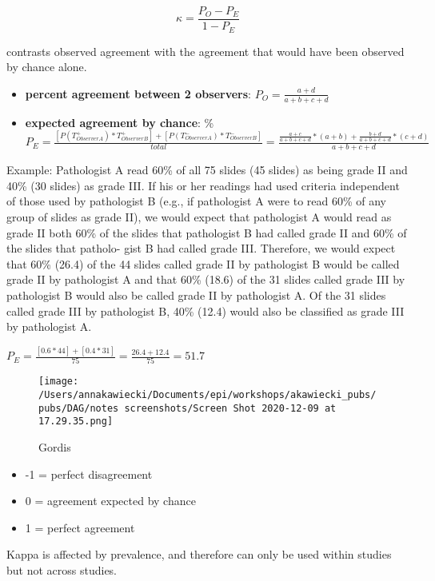 \documentclass[
]{article}
\providecommand{\tightlist}{%
  \setlength{\itemsep}{0pt}\setlength{\parskip}{0pt}}
\begin{document}
\[\kappa= \frac{P_O-P_E}{1-P_E}\]

contrasts observed agreement with the agreement that would have been
observed by chance alone.

\begin{itemize}
\item
  \textbf{percent agreement between 2 observers}:
  \(P_O = \frac{a+d}{a+b+c+d}\)
\item
  \textbf{expected agreement by chance}: \%
  \(P_E = \frac{[P(T_{ObserverA}^+) * T_{ObserverB}^+] + [P(T_{ObserverA}^-) * T_{ObserverB}^-]}{total}=\frac{\frac{a+c}{a+b+c+d}*(a+b) + \frac{b+d}{a+b+c+d}*(c+d)}{a+b+c+d}\)
\end{itemize}

Example: Pathologist A read 60\% of all 75 slides (45 slides) as being
grade II and 40\% (30 slides) as grade III. If his or her readings had
used criteria independent of those used by pathologist B (e.g., if
pathologist A were to read 60\% of any group of slides as grade II), we
would expect that pathologist A would read as grade II both 60\% of the
slides that pathologist B had called grade II and 60\% of the slides
that patholo- gist B had called grade III. Therefore, we would expect
that 60\% (26.4) of the 44 slides called grade II by pathologist B would
be called grade II by pathologist A and that 60\% (18.6) of the 31
slides called grade III by pathologist B would also be called grade II
by pathologist A. Of the 31 slides called grade III by pathologist B,
40\% (12.4) would also be classified as grade III by pathologist A.

\(P_E = \frac{[0.6 * 44] + [0.4 * 31]}{75}= \frac{26.4+ 12.4}{75}= 51.7\)

\begin{figure}
\centering
\texttt{[image: /Users/annakawiecki/Documents/epi/workshops/akawiecki\_pubs/pubs/DAG/notes screenshots/Screen Shot 2020-12-09 at 17.29.35.png]}
\caption{Gordis}
\end{figure}

\begin{itemize}
\tightlist
\item
  -1 = perfect disagreement
\item
  0 = agreement expected by chance
\item
  1 = perfect agreement
\end{itemize}

Kappa is affected by prevalence, and therefore can only be used within
studies but not across studies.
\end{document}

